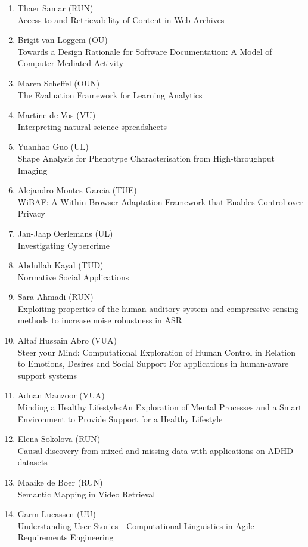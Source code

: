 \begin{multicols}{2}
\begin{scriptsize}
\begin{enumerate}[label=\textbf{2017-\arabic*},leftmargin=0cm,itemindent=1.15cm,labelwidth=\itemindent,labelsep=0cm,align=left,noitemsep]
\item Thaer Samar (RUN)    \\
	Access to and Retrievability of Content in Web Archives 
\item Brigit van Loggem (OU)     \\
	Towards a Design Rationale for Software Documentation: A Model of Computer-Mediated Activity 
\item Maren Scheffel (OUN)     \\
	The Evaluation Framework for Learning Analytics 
\item Martine de Vos (VU)     \\
	Interpreting natural science spreadsheets 
\item Yuanhao Guo (UL)     \\
	Shape Analysis for Phenotype Characterisation from High-throughput Imaging 
\item Alejandro Montes Garcia (TUE)     \\
	WiBAF: A Within Browser Adaptation Framework that Enables Control over Privacy 
\item Jan-Jaap Oerlemans (UL)    \\
	Investigating Cybercrime

\item Abdullah Kayal (TUD)     \\
	Normative Social Applications 

\item Sara Ahmadi (RUN)    \\
	Exploiting properties of the human auditory system and compressive sensing methods to increase noise robustness in ASR 
\item Altaf Hussain Abro (VUA)     \\
	Steer your Mind: Computational Exploration of Human Control in Relation to Emotions, Desires and Social Support For applications in human-aware support systems
\item Adnan Manzoor (VUA)     \\
	Minding a Healthy Lifestyle:An Exploration of Mental Processes and a Smart Environment to Provide Support for a Healthy Lifestyle
\item Elena Sokolova (RUN)     \\
	Causal discovery from mixed and missing data with applications on ADHD datasets 
\item Maaike de Boer (RUN)     \\
	Semantic Mapping in Video Retrieval
\item Garm Lucassen (UU)     \\
	Understanding User Stories - Computational Linguistics in Agile Requirements Engineering 


\end{enumerate}
\end{scriptsize}
\end{multicols}
